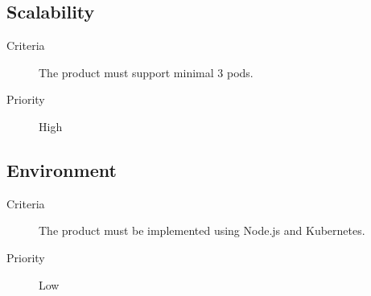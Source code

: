 \subsection{Scalability}
\begin{description}
\item[Criteria] The product must support minimal 3 pods.
\item[Priority] High
\end{description}

\subsection{Environment}
\begin{description}
\item[Criteria] The product must be implemented using Node.js and Kubernetes.
\item[Priority] Low
\end{description}